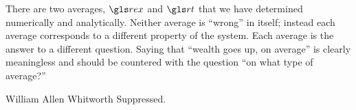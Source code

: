 There are two averages, $\rex$ and $\rt$ that we have determined numerically and analytically. 
Neither average is ``wrong'' in itself; instead each average corresponds to a different property
of the system. Each average is the answer to a different question. Saying that ``wealth 
goes up, on average'' is clearly meaningless and should be countered with the question 
``on what type of average?'' 

\begin{history}{William Allen Whitworth}
Suppressed.
%
\end{history}

